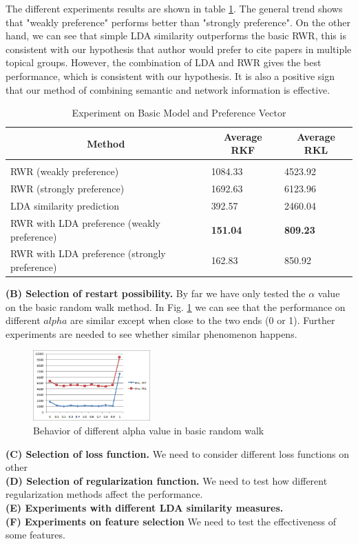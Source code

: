 \documentclass{article} %
\begin{document}
The different experiments results are shown in table \ref{results-table}. The general trend shows that "weakly preference" performs better than "strongly preference". On the other hand, we can see that simple LDA similarity outperforms the basic RWR, this is consistent with our hypothesis that author would prefer to cite papers in multiple topical groups. However, the combination of LDA and RWR gives the best performance, which is consistent with our hypothesis. It is also a positive sign that our method of combining semantic and network information is effective. \\
\begin{table}[t]
\caption{Experiment on Basic Model and Preference Vector}
\label{results-table}
\begin{center}
\begin{tabular}{lll}
\multicolumn{1}{c}{\bf Method}  &\multicolumn{1}{c}{\bf Average RKF} &\multicolumn{1}{c}{\bf Average RKL}
\\ \hline \\
RWR (weakly preference) &1084.33 &4523.92\\
RWR (strongly preference) &1692.63 &6123.96\\
LDA similarity prediction &392.57 &2460.04\\
RWR with LDA preference (weakly preference) &\textbf{151.04} &\textbf{809.23}\\
RWR with LDA preference (strongly preference) &162.83 &850.92\\
\end{tabular}
\end{center}
\end{table}
\textbf{(B) Selection of restart possibility.}
By far we have only tested the $\alpha$ value on the basic random walk method. In Fig. \ref{fig:evalAlpha} we can see that the performance on different $alpha$ are similar except when close to the two ends (0 or 1). Further experiments are needed to see whether similar phenomenon happens.\\ 
\begin{figure}[htb]
\centering
\includegraphics[width=0.4\textwidth]{evalAlpha}
\caption{Behavior of different alpha value in basic random walk}
\label{fig:evalAlpha}
\end{figure}
\textbf{(C) Selection of loss function.}
We need to consider different loss functions on other \\
\textbf{(D) Selection of regularization function.}
We need to test how different regularization methods affect the performance.\\
\textbf{(E) Experiments with different LDA similarity measures.}\\
\textbf{(F) Experiments on feature selection}
We need to test the effectiveness of some features.
\end{document}

